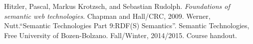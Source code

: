\documentclass{article}
\begin{document}
\begin{thebibliography}{99}
Hitzler, Pascal, Markus Krotzsch, and Sebastian Rudolph. \textit{Foundations of semantic web technologies}. Chapman and Hall/CRC, 2009.
Werner, Nutt.``Semantic Technologies Part 9:RDF(S) Semantics''. Semantic Technologies, Free University of Bozen-Bolzano. Fall/Winter, 2014/2015. Course handout.
\end{thebibliography}
\end{document}
